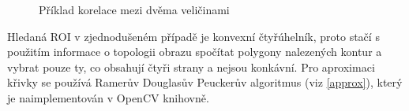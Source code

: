 \documentclass[twoside]{ctuthesis}
\theoremstyle{plain}
\theoremstyle{definition}
\theoremstyle{note}
\begin{document}
\begin{figure}
	
	\caption{Příklad korelace mezi dvěma veličinami}
	
	\label{korelace}	
	\hfill
\end{figure}
Hledaná ROI v zjednodušeném případě je konvexní čtyřúhelník, proto stačí s použitím informace o topologii obrazu spočítat polygony nalezených kontur a vybrat pouze ty, co obsahují čtyři strany a nejsou konkávní. Pro aproximaci křivky se používá Ramerův Douglasův Peuckerův algoritmus (viz \ref{approx}), který je naimplementován v OpenCV knihovně.
\end{document}

